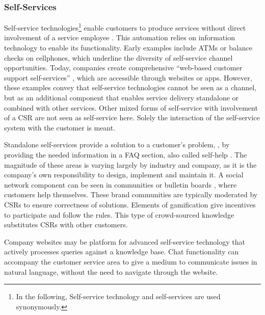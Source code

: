 	\subsubsection{Self-Services}
	\label{sec:ss}
		Self-service technologies\footnote{In the following, Self-service technology and self-services are used synonymously.} enable customers to produce services without direct involvement of a service employee \citep{meuter2000self}. This automation relies on information technology to enable its functionality. Early examples include ATMs or balance checks on cellphones, which underline the diversity of self-service channel opportunities. Today, companies create comprehensive \enquote{web-based customer support self-services} \citep{Thomas:2009}, which are accessible through websites or apps. However, these examples convey that self-service technologies cannot be seen as a channel, but as an additional component that enables service delivery standalone or combined with other services. Other mixed forms of self-service with involvement of a \acrshort{CSR} \citep{Globerson_1991}  are not seen as self-service here. Solely the interaction of the self-service system with the customer is meant.
		
		Standalone self-services provide a solution to a customer's problem, \ie, by providing the needed information in a \acrshort{FAQ} section, also called self-help \citep{meuter2000self}. The magnitude of these areas is varying largely by industry and company, as it is the company's own responsibility to design, implement and maintain it. A social network component can be seen in communities or bulletin boards \citep{Thomas:2009}, where customers help themselves. These brand communities \citep{Hsieh_2017} are typically moderated by \acrshort{CSR}s to ensure correctness of solutions. Elements of gamification give incentives to participate and follow the rules. This type of crowd-sourced knowledge substitutes \acrshort{CSR}s with other customers.
		
		Company websites may be platform for advanced self-service technology that actively processes queries against a knowledge base. Chat functionality can accompany the customer service area to give a medium to communicate issues in natural language, without the need to navigate through the website. 
		
		
